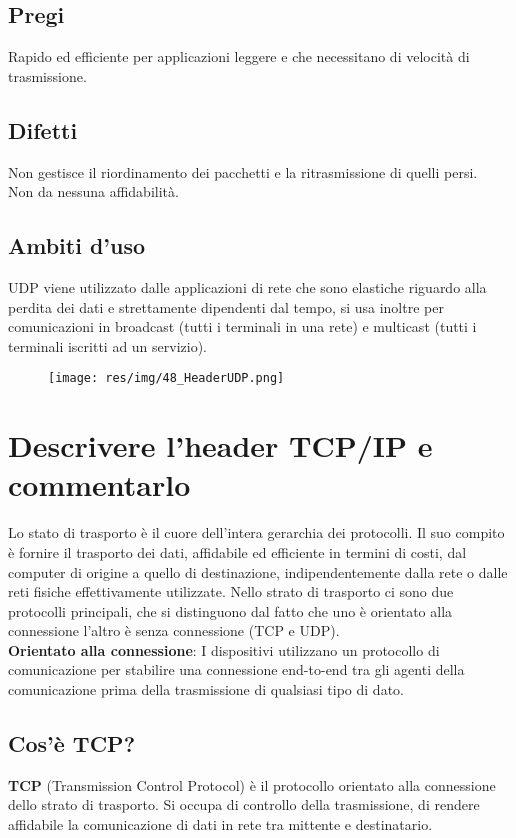 \subsection{Pregi}
Rapido ed efficiente per applicazioni leggere e che necessitano di velocità di trasmissione.
\subsection{Difetti}
Non gestisce il riordinamento dei pacchetti e la ritrasmissione di quelli persi.\\
Non da nessuna affidabilità.
\subsection{Ambiti d'uso}
UDP viene utilizzato dalle applicazioni di rete che sono elastiche riguardo alla perdita dei dati e strettamente dipendenti dal tempo, si usa inoltre per comunicazioni in broadcast (tutti i terminali in una rete) e multicast (tutti i terminali iscritti ad un servizio).

\begin{figure}[H]
\centering
\texttt{[image: res/img/48\_HeaderUDP.png]}
\end{figure}
 
\section{Descrivere l'header TCP/IP e commentarlo}
Lo stato di trasporto è il cuore dell'intera gerarchia dei protocolli. Il suo compito è fornire il trasporto dei dati, affidabile ed efficiente in termini di costi, dal computer di origine a quello di destinazione, indipendentemente dalla rete o dalle reti fisiche effettivamente utilizzate.
Nello strato di trasporto ci sono due protocolli principali, che si distinguono dal fatto che uno è orientato alla connessione l'altro è senza connessione (TCP e UDP).\\
\textbf{Orientato alla connessione}: I dispositivi utilizzano un protocollo di comunicazione per stabilire una connessione end-to-end tra gli agenti della comunicazione prima della trasmissione di qualsiasi tipo di dato.
\subsection{Cos'è TCP?}
\textbf{TCP} (Transmission Control Protocol) è il protocollo orientato alla connessione dello strato di trasporto. Si occupa di controllo della trasmissione, di rendere affidabile la comunicazione di dati in rete tra mittente e destinatario.

